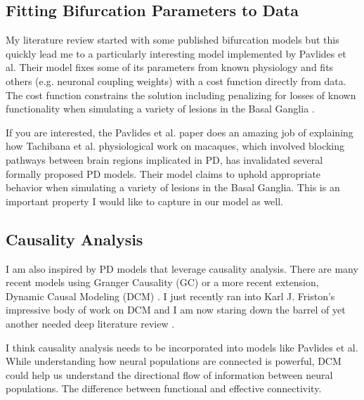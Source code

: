 \documentclass[usletter,12pt]{article} %
\begin{document}

\subsection{Fitting Bifurcation Parameters to Data}

\noindent 
My literature review started with some published bifurcation models \cite{merrison2013interactive} \cite{nevado2011bifurcation} but this quickly lead me to a particularly interesting model implemented by Pavlides et al.  Their model fixes some of its parameters from known physiology and fits others (e.g. neuronal coupling weights) with a cost function directly from data.  The cost function constrains the solution including penalizing for losses of known functionality when simulating a variety of lesions in the Basal Ganglia \cite{pavlides2015computational} \cite{tachibana2011subthalamo}.

\noindent 
If you are interested, the Pavlides et al. paper does an amazing job of explaining how Tachibana et al. physiological work on macaques, which involved blocking pathways between brain regions implicated in PD, has invalidated several formally proposed PD models.  Their model claims to uphold appropriate behavior when simulating a variety of lesions in the Basal Ganglia. This is an important property I would like to capture in our model as well.


\subsection{Causality Analysis}

\noindent 
I am also inspired by PD models that leverage causality analysis.  There are many recent models using Granger Causality (GC) \cite{kerr2013cortical} \cite{florin2016parkinson} or a more recent extension, Dynamic Causal Modeling (DCM) \cite{sheikhattar2016dynamic}.  I just recently ran into Karl J. Friston’s impressive body of work on DCM and I am now staring down the barrel of yet another needed deep literature review \cite{razi2016connected} \cite{zeller2016dynamic} \cite{penny2009dynamic} \cite{bajaj2016bridging}.

\noindent 
I think causality analysis needs to be incorporated into models like Pavlides et al. While understanding how neural populations are connected is powerful, DCM could help us understand the directional flow of information between neural populations.  The difference between functional and effective connectivity.
\end{document}
